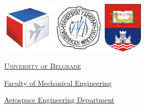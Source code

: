 \documentclass[12pt,oneside]{book}
\begin{document}
\frontmatter
\begin{titlepage}
	\centering
	\vspace*{\fill}
	
    \href{http://vaz.mas.bg.ac.rs/}{\includegraphics[height=2.5cm]{vaz-logo-t}}
    \hspace{0.2cm}
    \href{https://www.mas.bg.ac.rs/}{\includegraphics[height=2.5cm]{mfb-logo-t}}
    \hspace{0.2cm}
    \href{https://www.bg.ac.rs/}{\includegraphics[height=2.5cm]{ub-logo-t}}
    
    \vspace{0.5cm}
    
    {\scshape \LARGE \href{https://www.bg.ac.rs/}{\textcolor{tamno-siva}{University of Belgrade}}\par \href{https://www.mas.bg.ac.rs/}{Faculty of Mechanical Engineering}\par \href{http://vaz.mas.bg.ac.rs/}{\textcolor{tamno-plava}{Aerospace Engineering Department}}\par} %
    \vspace{0.5cm}

\noindent\hspace{-0.5cm}\makebox[\linewidth]{\textcolor{svetlo-plava}{\rule{\paperwidth}{5pt}}}
	

\end{titlepage}
\end{document}
